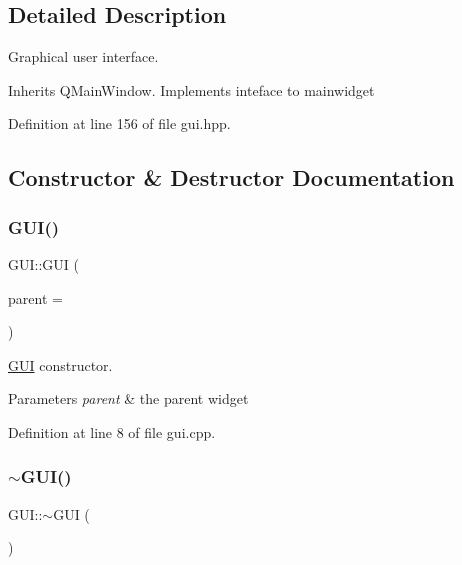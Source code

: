 \subsection{Detailed Description}
Graphical user interface. 

Inherits Q\+Main\+Window. Implements inteface to mainwidget 

Definition at line 156 of file gui.\+hpp.



\subsection{Constructor \& Destructor Documentation}
\mbox{\label{classGUI_acb0ba8c6fc121d814d30560e2c29f2fe}} 
\subsubsection{\texorpdfstring{G\+U\+I()}{GUI()}}
{\footnotesize\ttfamily G\+U\+I\+::\+G\+UI (\begin{DoxyParamCaption}\item[{Q\+Widget $\ast$}]{parent = {} }\end{DoxyParamCaption})}



\mbox{\hyperlink{classGUI}{G\+UI}} constructor. 


\begin{DoxyParams}{Parameters}
{\em parent} & the parent widget \\
\hline
\end{DoxyParams}


Definition at line 8 of file gui.\+cpp.

\mbox{\label{classGUI_ac9cae2328dcb5d83bdfaeca49a2eb695}} 
\subsubsection{\texorpdfstring{$\sim$\+G\+U\+I()}{~GUI()}}
{\footnotesize\ttfamily G\+U\+I\+::$\sim$\+G\+UI (\begin{DoxyParamCaption}{ }\end{DoxyParamCaption})\hspace{0.3cm}{\ttfamily [inline]}}



